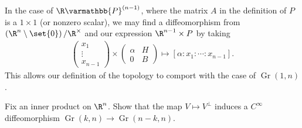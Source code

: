 \documentclass[10pt]{mypackage}
\renewcommand*{\mathbb}[1]{\varmathbb{#1}}
\begin{document}
\begin{solution}
In the case of $\R\mathbb{P}^{(n-1)}$, where the matrix $A$ in the definition of $P$ is a $1\times 1$ (or nonzero scalar), we may find a diffeomorphism from $\left( \R^{n}\setminus \set{0} \right)/\R^{\times}$ and our expression $\R^{n-1}\times P$ by taking
\begin{align*}
  \begin{pmatrix}x_1\\\vdots\\x_{n-1}\end{pmatrix} \times \begin{pmatrix}\alpha & H \\ 0 & B\end{pmatrix} \mapsto \left[ \alpha:x_1:\cdots:x_{n-1} \right].
\end{align*}
This allows our definition of the topology to comport with the case of $\operatorname{Gr}\left( 1,n \right)$.
\end{solution}
\begin{problem}[Problem 2]
  Fix an inner product on $\R^n$. Show that the map $V\mapsto V^{\perp}$ induces a $C^{\infty}$ diffeomorphism $\operatorname{Gr}\left( k,n \right)\rightarrow \operatorname{Gr}\left( n-k,n \right)$.
\end{problem}
\end{document}
